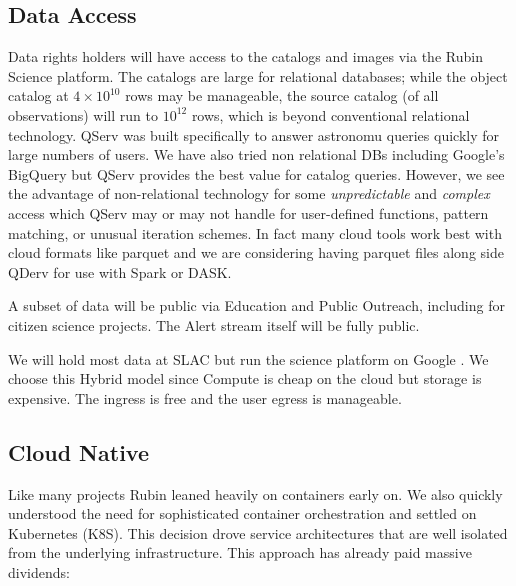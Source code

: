 \documentclass[11pt,twoside]{article}
\begin{document}
\begin{centering}
\end{centering}


\subsection{Data Access} \label{sec:dataaccess}

Data rights holders will have access to the catalogs and images via the Rubin Science platform.
The catalogs are large for relational databases; while the object catalog at $4 \times 10^{10}$ rows may be manageable,
the source catalog (of all observations) will run to $10^{12}$ rows, which is beyond conventional relational technology.
QServ \citep{C15_adassxxxii} was built specifically to answer astronomu queries quickly for large numbers of users.
We have also tried non relational DBs including Google's BigQuery \citet[e.g.,][]{Document-31100} but QServ provides the best value for catalog queries.
However, we see the advantage of non-relational technology for
some \emph{unpredictable} and \emph{complex} access which QServ may or may not handle for user-defined functions, pattern matching, or unusual iteration schemes.
In fact many cloud tools work best with cloud formats like parquet and
 we are considering having parquet files along side QDerv for use with Spark or DASK.

A subset of data will be public via Education and Public Outreach, including for citizen science projects.
The Alert stream itself will be fully public.

We will hold most data at SLAC but run the science platform on Google \citep{2021arXiv211115030O}.
We choose this Hybrid model since Compute is cheap on the cloud but storage is expensive.
The ingress is free and the user egress is manageable.

\subsection{Cloud Native}\label{sec:cloudnative}
Like many projects \citep{2017ASPC..512...33O} Rubin leaned heavily on containers early on.
We also quickly understood the need for sophisticated container orchestration and settled on Kubernetes (K8S).
This decision drove service architectures that are well isolated from the underlying infrastructure.
This approach has already paid massive dividends:
\end{document}
